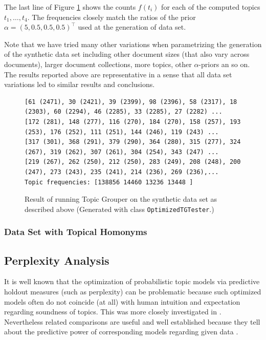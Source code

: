\documentclass[10pt, a4paper, oneside]{article}
\begin{document}
The last line of Figure \ref{tgresult} shows the counts $f(t_i)$ for each of the computed topics $t_1,\ldots,t_4$. The frequencies closely match the ratios of the prior $\alpha = (5, 0.5, 0.5, 0.5)^\top$ used at the generation of data set.

Note that we have tried many other variations when parametrizing the generation of the synthetic data set including other document sizes (that also vary across documents), larger document collections, more topics, other $\alpha$-priors an so on. The results reported above are representative in a sense that all data set variations led to similar results and conclusions.

\begin{figure}
{\tiny
\begin{verbatim}
[61 (2471), 30 (2421), 39 (2399), 98 (2396), 58 (2317), 18 (2303), 60 (2294), 46 (2285), 33 (2285), 27 (2282) ...
[172 (281), 148 (277), 116 (270), 184 (270), 158 (257), 193 (253), 176 (252), 111 (251), 144 (246), 119 (243) ...
[317 (301), 368 (291), 379 (290), 364 (280), 315 (277), 324 (267), 319 (262), 307 (261), 304 (254), 343 (247) ...
[219 (267), 262 (250), 212 (250), 283 (249), 208 (248), 200 (247), 273 (243), 235 (241), 214 (236), 269 (236),...
Topic frequencies: [138856 14460 13236 13448 ]\end{verbatim}}
\caption{Result of running Topic Grouper on the synthetic data set as described above (Generated with class \texttt{OptimizedTGTester}.)}
\label{tgresult}
\end{figure}

\subsubsection{Data Set with Topical Homonyms}

\subsection{Perplexity Analysis}

It is well known that the optimization of probabilistic topic models via predictive holdout measures (such as perplexity) can be problematic because such optimized models often do not coincide (at all) with human intuition and expectation regarding soundness of topics.
This was more closely investigated in \cite{Chang:Boyd-Graber:Wang:Gerrish:Blei-2009}. Nevertheless related comparisons are useful and well established because they tell about the predictive power of corresponding models regarding given data \cite{Blei:2003:LDA:944919.944937, chen:wang}.
\end{document}
